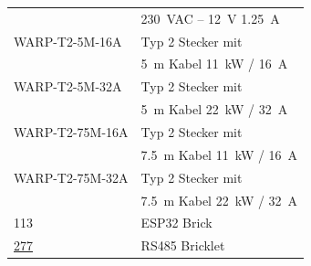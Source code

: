 \documentclass[a4paper,10pt]{article}
\begin{document}
\begin{multicols*}{2}
\begin{tabular}{ll}
		                                                                                                                         & \SI{230}{\volt}AC – \SI{12}{\volt} \SI{1,25}{\ampere}         \\
		\cmidrule(lr{0.5em}){1-2}
		WARP-T2-5M-16A                                                                                                           & Typ 2 Stecker mit                                             \\
		                                                                                                                         & \SI{5}{\meter} Kabel \SI{11}{\kilo\watt} / \SI{16}{\ampere}   \\
		\cmidrule(lr{0.5em}){1-2}
		WARP-T2-5M-32A                                                                                                           & Typ 2 Stecker mit                                             \\
		                                                                                                                         & \SI{5}{\meter} Kabel \SI{22}{\kilo\watt} / \SI{32}{\ampere}   \\
		\cmidrule(lr{0.5em}){1-2}
		WARP-T2-75M-16A                                                                                                          & Typ 2 Stecker mit                                             \\
		                                                                                                                         & \SI{7,5}{\meter} Kabel \SI{11}{\kilo\watt} / \SI{16}{\ampere} \\
		\cmidrule(lr{0.5em}){1-2}
		WARP-T2-75M-32A                                                                                                          & Typ 2 Stecker mit                                             \\
		                                                                                                                         & \SI{7,5}{\meter} Kabel \SI{22}{\kilo\watt} / \SI{32}{\ampere} \\
		\cmidrule(lr{0.5em}){1-2}
		113                                                                                                                      & ESP32 Brick                                                   \\
		\cmidrule(lr{0.5em}){1-2}
		\href{https://www.tinkerforge.com/de/shop/bricklets/rs485-bricklet.html}{277}                                            & RS485 Bricklet                                                \\

\end{tabular}
\end{multicols*}
\end{document}
